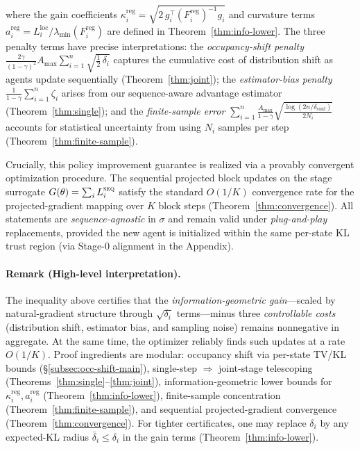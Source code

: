 \documentclass[sigconf]{aamas}
\begin{document}
where the gain coefficients $\kappa_i^{\mathrm{reg}}=\sqrt{2\,g_i^{\!\top}(F_i^{\mathrm{reg}})^{-1}g_i}$ and curvature terms $a_i^{\mathrm{reg}}=L_i^{\mathrm{loc}}/\lambda_{\min}(F_i^{\mathrm{reg}})$ are defined in Theorem~\ref{thm:info-lower}. The three penalty terms have precise interpretations: the \emph{occupancy-shift penalty} $\frac{2\gamma}{(1-\gamma)^2}A_{\max}\sum_{i=1}^{n}\sqrt{\tfrac12\,\delta_i}$ captures the cumulative cost of distribution shift as agents update sequentially (Theorem~\ref{thm:joint}); the \emph{estimator-bias penalty} $\frac{1}{1-\gamma}\sum_{i=1}^{n}\zeta_i$ arises from our sequence-aware advantage estimator (Theorem~\ref{thm:single}); and the \emph{finite-sample error} $\sum_{i=1}^{n}\frac{A_{\max}}{1-\gamma}\sqrt{\frac{\log(2n/\delta_{\mathrm{conf}})}{2N_i}}$ accounts for statistical uncertainty from using $N_i$ samples per step (Theorem~\ref{thm:finite-sample}).

Crucially, this policy improvement guarantee is realized via a provably convergent optimization procedure. The sequential projected block updates on the stage surrogate $G(\theta)=\sum_i L_i^{\textsc{seq}}$ satisfy the standard $O(1/K)$ convergence rate for the projected-gradient mapping over $K$ block steps (Theorem~\ref{thm:convergence}). All statements are \emph{sequence-agnostic} in $\sigma$ and remain valid under \emph{plug-and-play} replacements, provided the new agent is initialized within the same per-state KL trust region (via Stage-0 alignment in the Appendix).

\paragraph{Remark (High-level interpretation).}
The inequality above certifies that the \emph{information-geometric gain}—scaled by natural-gradient structure through $\sqrt{\delta_i}$ terms—minus three \emph{controllable costs} (distribution shift, estimator bias, and sampling noise) remains nonnegative in aggregate. At the same time, the optimizer reliably finds such updates at a rate $O(1/K)$. Proof ingredients are modular: occupancy shift via per-state TV/KL bounds (§\ref{subsec:occ-shift-main}), single-step $\Rightarrow$ joint-stage telescoping (Theorems~\ref{thm:single}--\ref{thm:joint}), information-geometric lower bounds for $\kappa_i^{\mathrm{reg}}, a_i^{\mathrm{reg}}$ (Theorem~\ref{thm:info-lower}), finite-sample concentration (Theorem~\ref{thm:finite-sample}), and sequential projected-gradient convergence (Theorem~\ref{thm:convergence}). For tighter certificates, one may replace $\delta_i$ by any expected-KL radius $\bar\delta_i\le \delta_i$ in the gain terms (Theorem~\ref{thm:info-lower}).
\end{document}
